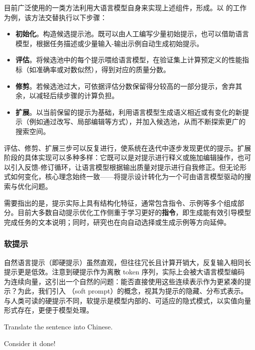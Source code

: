 目前广泛使用的一类方法利用大语言模型自身来实现上述组件，形成。以 \citet{zhou-etal:2023large} 的工作为例，该方法交替执行以下步骤：

\begin{itemize}
\item \textbf{初始化}。构造候选提示池。既可以由人工编写少量初始提示，也可以借助语言模型，根据任务描述或少量输入-输出示例自动生成初始提示。
\item \textbf{评估}。将候选池中的每个提示喂给语言模型，在验证集上计算预定义的性能指标（如准确率或对数似然），得到对应的质量分数。
\item \textbf{修剪}。若候选池过大，可依据评估分数保留得分较高的一部分提示，舍弃其余，以减轻后续步骤的计算负担。
\item \textbf{扩展}。以当前保留的提示为基础，利用语言模型生成语义相近或有变化的新提示（例如通过改写、局部编辑等方式），并加入候选池，从而不断探索更广的搜索空间。
\end{itemize}

评估、修剪、扩展三步可以反复进行，使系统在迭代中逐步发现更优的提示。扩展阶段的具体实现可以多种多样：它既可以是对提示进行释义或施加编辑操作，也可以引入反馈-修订循环，让语言模型根据输出质量对提示进行自我修正。但无论形式如何变化，核心理念始终一致——将提示设计转化为一个可由语言模型驱动的搜索与优化问题。

需要指出的是，提示实际上具有结构化特征，通常包含指令、示例等多个组成部分。目前大多数自动提示优化工作侧重于学习更好的\textbf{指令}，即生成能有效引导模型完成任务的文本说明；同时，研究也在向自动选择或生成示例等方向延伸。

\subsubsection{软提示}
\label{sec:soft-prompts}

\noindent 自然语言提示（即硬提示）虽然直观，但往往冗长且计算开销大，反复输入相同长提示更是低效。注意到硬提示作为离散 token 序列，实际上会被大语言模型编码为连续向量，这引出一个自然的问题：能否直接使用这些连续表示作为更紧凑的提示？为此，我们引入 （soft prompt）的概念，视其为提示的隐藏、分布式表示。与人类可读的硬提示不同，软提示是模型内部的、可适应的隐式模式，以实值向量形式存在，更便于模型处理。

\vspace{0.5em}
\begin{tcolorbox}
\begingroup
\setlength{\leftskip}{2em}
\setlength{\rightskip}{2em}

Translate the sentence into Chinese.

\vspace{0.5em}

Consider it done!

\vspace{0.5em}

\underline{\hspace{2em}}

\endgroup
\end{tcolorbox}
\vspace{0.5em}

